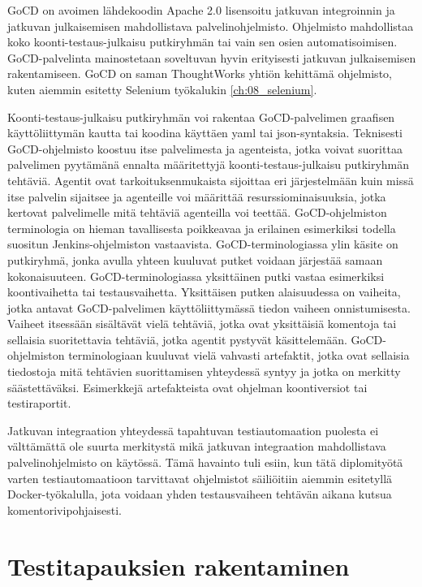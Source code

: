     GoCD on avoimen lähdekoodin Apache 2.0 lisensoitu jatkuvan integroinnin ja jatkuvan julkaisemisen mahdollistava palvelinohjelmisto.
    Ohjelmisto mahdollistaa koko koonti-testaus-julkaisu putkiryhmän tai vain sen osien automatisoimisen.
    GoCD-palvelinta mainostetaan soveltuvan hyvin erityisesti jatkuvan julkaisemisen rakentamiseen.
    GoCD on saman ThoughtWorks yhtiön kehittämä ohjelmisto, kuten aiemmin esitetty Selenium työkalukin \ref{ch:08_selenium}.

    Koonti-testaus-julkaisu putkiryhmän voi rakentaa GoCD-palvelimen graafisen käyttöliittymän kautta tai koodina käyttäen yaml tai json-syntaksia.
    Teknisesti GoCD-ohjelmisto koostuu itse palvelimesta ja agenteista, jotka voivat suorittaa palvelimen pyytämänä ennalta määritettyjä koonti-testaus-julkaisu putkiryhmän tehtäviä.
    Agentit ovat tarkoituksenmukaista sijoittaa eri järjestelmään kuin missä itse palvelin sijaitsee ja agenteille voi määrittää resurssiominaisuuksia, jotka kertovat palvelimelle mitä tehtäviä agenteilla voi teettää.
    GoCD-ohjelmiston terminologia on hieman tavallisesta poikkeavaa ja erilainen esimerkiksi todella suositun Jenkins-ohjelmiston vastaavista.
    GoCD-terminologiassa ylin käsite on putkiryhmä, jonka avulla yhteen kuuluvat putket voidaan järjestää samaan kokonaisuuteen.
    GoCD-terminologiassa yksittäinen putki vastaa esimerkiksi koontivaihetta tai testausvaihetta.
    Yksittäisen putken alaisuudessa on vaiheita, jotka antavat GoCD-palvelimen käyttöliittymässä tiedon vaiheen onnistumisesta.
    Vaiheet itsessään sisältävät vielä tehtäviä, jotka ovat yksittäisiä komentoja tai sellaisia suoritettavia tehtäviä, jotka agentit pystyvät käsittelemään.
    GoCD-ohjelmiston terminologiaan kuuluvat vielä vahvasti artefaktit, jotka ovat sellaisia tiedostoja mitä tehtävien suorittamisen yhteydessä syntyy ja jotka on merkitty säästettäväksi.
    Esimerkkejä artefakteista ovat ohjelman koontiversiot tai testiraportit.

    Jatkuvan integraation yhteydessä tapahtuvan testiautomaation puolesta ei välttämättä ole suurta merkitystä mikä jatkuvan integraation mahdollistava palvelinohjelmisto on käytössä.
    Tämä havainto tuli esiin, kun tätä diplomityötä varten testiautomaatioon tarvittavat ohjelmistot säiliöitiin aiemmin esitetyllä Docker-työkalulla, jota voidaan yhden testausvaiheen tehtävän aikana kutsua komentorivipohjaisesti.

\section{Testitapauksien rakentaminen} \label{ch:08_testitapauksien_rakentaminen}


